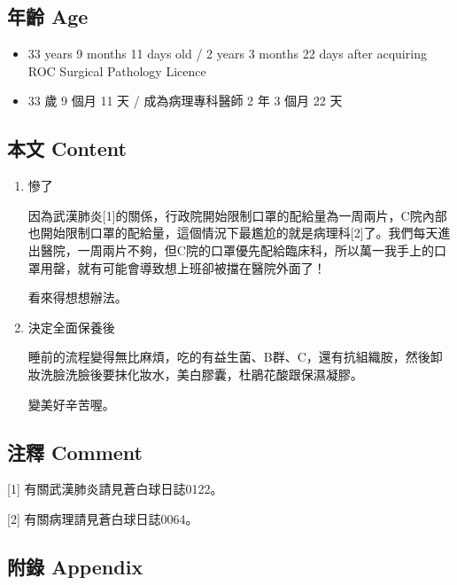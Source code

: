 \documentclass[
]{article}
\providecommand{\tightlist}{%
  \setlength{\itemsep}{0pt}\setlength{\parskip}{0pt}}
\begin{document}
\hypertarget{ux5e74ux9f61-age-2}{%
\subsection{年齡 Age}\label{ux5e74ux9f61-age-2}}

\begin{itemize}
\tightlist
\item
  33 years 9 months 11 days old / 2 years 3 months 22 days after
  acquiring ROC Surgical Pathology Licence
\item
  33 歲 9 個月 11 天 / 成為病理專科醫師 2 年 3 個月 22 天
\end{itemize}

\hypertarget{ux672cux6587-content-2}{%
\subsection{本文 Content}\label{ux672cux6587-content-2}}

\begin{enumerate}
\def\labelenumi{\arabic{enumi}.}
\item
  慘了

  因為武漢肺炎{[}1{]}的關係，行政院開始限制口罩的配給量為一周兩片，C院內部也開始限制口罩的配給量，這個情況下最尷尬的就是病理科{[}2{]}了。我們每天進出醫院，一周兩片不夠，但C院的口罩優先配給臨床科，所以萬一我手上的口罩用罄，就有可能會導致想上班卻被擋在醫院外面了！

  看來得想想辦法。
\item
  決定全面保養後

  睡前的流程變得無比麻煩，吃的有益生菌、B群、C，還有抗組織胺，然後卸妝洗臉洗臉後要抹化妝水，美白膠囊，杜鵑花酸跟保濕凝膠。

  變美好辛苦喔。
\end{enumerate}

\hypertarget{ux6ce8ux91cb-comment-2}{%
\subsection{注釋 Comment}\label{ux6ce8ux91cb-comment-2}}

{[}1{]} 有關武漢肺炎請見蒼白球日誌0122。

{[}2{]} 有關病理請見蒼白球日誌0064。

\hypertarget{ux9644ux9304-appendix-2}{%
\subsection{附錄 Appendix}\label{ux9644ux9304-appendix-2}}
\end{document}
